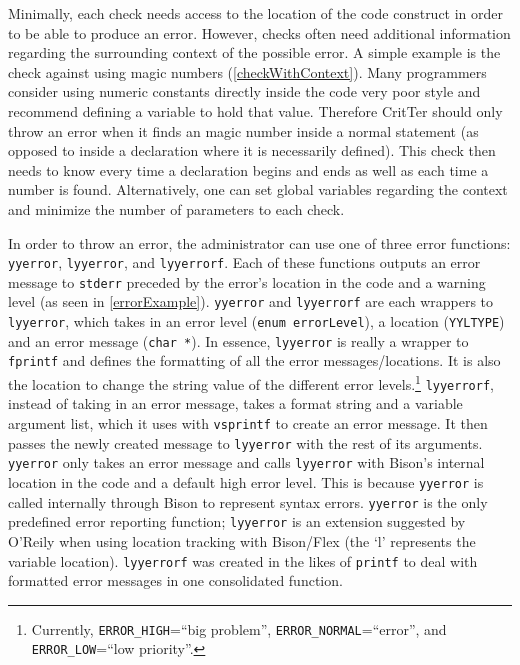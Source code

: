 \documentclass[12pt]{report}
\newcommand{\programName}{CritTer\xspace}
\begin{document}
Minimally, each check needs access to the location of the code construct in order to be able to produce 
an error. However, checks often need additional information regarding the surrounding context of 
the possible error. A simple example is the check against using magic numbers 
(\autoref{checkWithContext}). Many programmers consider using numeric constants directly inside the 
code very poor style and recommend defining a variable to hold that value. Therefore \programName 
should only throw an error when it finds an magic number inside a normal statement (as opposed to 
inside a declaration where it is necessarily defined). This check then needs to know every time a 
declaration begins and ends as well as each time a number is found. Alternatively, one can set global 
variables regarding the context and minimize the number of parameters to each check.

\newcommand{\yyerror}{\lstinline{yyerror}\xspace}
\newcommand{\lyyerror}{\lstinline{lyyerror}\xspace}
\newcommand{\lyyerrorf}{\lstinline{lyyerrorf}\xspace}

In order to throw an error, the administrator can use one of three error functions: \yyerror, \lyyerror, and 
\lyyerrorf. Each of these functions outputs an error message to \lstinline{stderr} preceded by the error's 
location in the code and a warning level (as seen in \autoref{errorExample}). \yyerror and \lyyerrorf 
are each wrappers to \lyyerror, which takes in an error level (\lstinline{enum errorLevel}), a location 
(\lstinline{YYLTYPE}) and an error message (\lstinline{char *}). In essence, \lyyerror is really a wrapper 
to \lstinline{fprintf} and defines the formatting of all the error messages\slash locations. It is also the 
location to change the string value of the different error levels.\footnote{Currently, 
\lstinline{ERROR_HIGH}=``big problem'', \lstinline{ERROR_NORMAL}=``error'', and 
\lstinline{ERROR_LOW}=``low priority''.}  
\lyyerrorf, instead of taking in an error message, takes a format string and a variable argument list, 
which it uses with \lstinline{vsprintf} to create an error message. It then passes the newly created 
message to \lyyerror with the rest of its arguments. \yyerror only takes an error message and calls 
\lyyerror with Bison's internal location in the code and a default high error level. This is because 
\yyerror is called internally through Bison to represent syntax errors. \yyerror is the only predefined 
error reporting function; \lyyerror is an extension suggested by O'Reily\cite{flex-and-bison} when using 
location tracking with Bison\slash Flex (the `l' represents the variable location). \lyyerrorf was created in 
the likes of \lstinline{printf} to deal with formatted error messages in one consolidated function.
\end{document}
